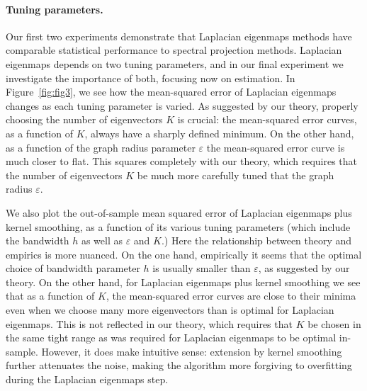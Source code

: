 \paragraph{Tuning parameters.}
Our first two experiments demonstrate that Laplacian eigenmaps methods have comparable statistical performance to spectral projection methods. Laplacian eigenmaps depends on two tuning parameters, and in our final experiment we investigate the importance of both, focusing now on estimation. In Figure~\ref{fig:fig3}, we see how the mean-squared error of Laplacian eigenmaps changes as each tuning parameter is varied. As suggested by our theory, properly choosing the number of eigenvectors $K$ is crucial: the mean-squared error curves, as a function of $K$, always have a sharply defined minimum. On the other hand, as a function of the graph radius parameter $\varepsilon$ the mean-squared error curve is much closer to flat. This squares completely with our theory, which requires that the number of eigenvectors $K$ be much more carefully tuned that the graph radius $\varepsilon$.

We also plot the out-of-sample mean squared error of Laplacian eigenmaps plus kernel smoothing, as a function of its various tuning parameters (which include the bandwidth $h$ as well as $\varepsilon$ and $K$.) Here the relationship between theory and empirics is more nuanced. On the one hand, empirically it seems that the optimal choice of bandwidth parameter $h$ is usually smaller than $\varepsilon$, as suggested by our theory. On the other hand, for Laplacian eigenmaps plus kernel smoothing we see that as a function of $K$, the mean-squared error curves are close to their minima even when we choose many more eigenvectors than is optimal for Laplacian eigenmaps. This is not reflected in our theory, which requires that $K$ be chosen in the same tight range as was required for Laplacian eigenmaps to be optimal in-sample. However, it does make intuitive sense: extension by kernel smoothing further attenuates the noise, making the algorithm more forgiving to overfitting during the Laplacian eigenmaps step. 

